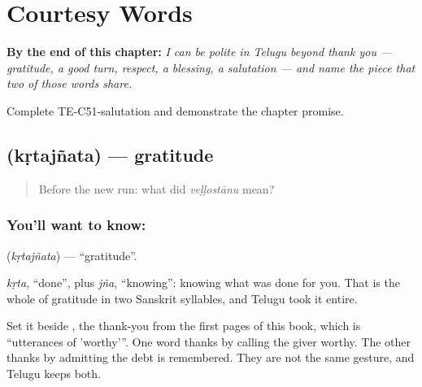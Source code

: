 
\chapter{Courtesy Words}
\label{ch:te-courtesy}

\begin{chapteropening}
\textbf{By the end of this chapter:} \emph{I can be polite in Telugu beyond thank you --- gratitude, a good turn, respect, a blessing, a salutation --- and name the piece that two of those words share.}

Complete TE-C51-salutation and demonstrate the chapter promise.
\end{chapteropening}

\section[\texorpdfstring{\te{కృతజ్ఞత} (kṛtajñata)}{కృతజ్ఞత (kṛtajñata)}]{ (kṛtajñata) — gratitude}

\label{lesson:TE-C51-gratitude}



\begin{quote}
Before the new run: what did \emph{veḷḷostānu} mean?
\end{quote}

\subsection*{You'll want to know: }
\textbf{} (\emph{kṛtajñata}) — \textquotedblleft{}gratitude\textquotedblright{}.

\emph{kṛta}, \textquotedblleft{}done\textquotedblright{}, plus \emph{jña}, \textquotedblleft{}knowing\textquotedblright{}: knowing what was done for you. That is the whole of gratitude in two Sanskrit syllables, and Telugu took it entire.

Set it beside , the thank-you from the first pages of this book, which is \textquotedblleft{}utterances of 'worthy'\textquotedblright{}. One word thanks by calling the giver worthy. The other thanks by admitting the debt is remembered. They are not the same gesture, and Telugu keeps both.

